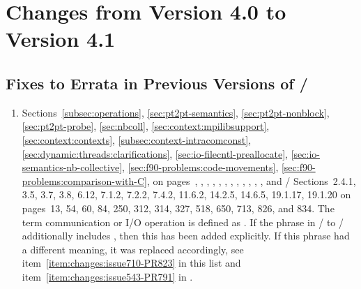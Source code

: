 \section{Changes from Version 4.0 to Version 4.1}
\label{subsec:40to41}

\subsection{Fixes to Errata in Previous Versions of \texorpdfstring{\MPI/}{MPI}}
\label{sec:changes-40-41-errata}

\begin{enumerate}

\item
  Sections~\ref{subsec:operations}, \ref{sec:pt2pt-semantics}, \ref{sec:pt2pt-nonblock}, \ref{sec:pt2pt-probe}, \ref{sec:nbcoll},
\ref{sec:context:mpilibsupport}, \ref{sec:context:contexts}, \ref{subsec:context-intracomconst},
\ref{sec:dynamic:threads:clarifications}, \ref{sec:io-filecntl-preallocate}, \ref{sec:io-semantics-nb-collective},
\ref{sec:f90-problems:code-movements}, \ref{sec:f90-problems:comparison-with-C},
  on pages~\pageref{subsec:operations}, \pageref{sec:pt2pt-semantics}, \pageref{sec:pt2pt-nonblock}, \pageref{sec:pt2pt-probe},
\pageref{sec:nbcoll}, \pageref{sec:context:mpilibsupport}, \pageref{sec:context:contexts}, \pageref{subsec:context-intracomconst},
\pageref{sec:dynamic:threads:clarifications}, \pageref{sec:io-filecntl-preallocate}, \pageref{sec:io-semantics-nb-collective},
\pageref{sec:f90-problems:code-movements}, \pageref{sec:f90-problems:comparison-with-C}
  and \MPIIVDOTO/ Sections~2.4.1, 3.5, 3.7, 3.8, 6.12, 7.1.2, 7.2.2, 7.4.2, 11.6.2, 14.2.5, 14.6.5, 19.1.17, 19.1.20
  on pages~13, 54, 60, 84, 250, 312, 314, 327, 518, 650, 713, 826, and 834.
  \newline
  The term 
  communication or I/O operation is defined as .
  If the phrase  in \MPIIDOTI/ to \MPIIVDOTO/ additionally includes
  , then this has
been added explicitly.
  If this phrase had a different meaning, it was replaced accordingly, see
  item~\ref{item:changes:issue710-PR823} in this list and  %
  item~\ref{item:changes:issue543-PR791} in .  %


\end{enumerate}
